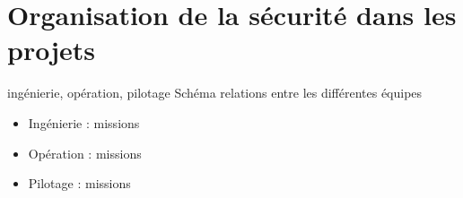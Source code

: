 

\section{Organisation de la sécurité dans les projets}
ingénierie, opération, pilotage
Schéma relations entre les différentes équipes
\begin{itemize}
    \item Ingénierie : missions
    \item Opération : missions
    \item Pilotage : missions
\end{itemize}
